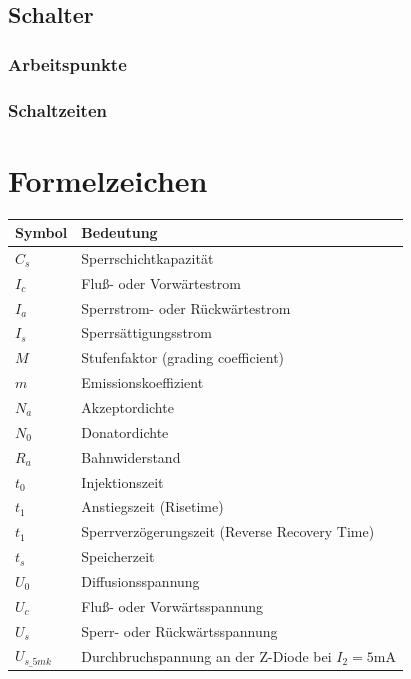 \documentclass[
	a4paper, %
	12pt, %
]{CSUniSchoolLabReport}
\begin{document}
\subsection{Schalter}
\subsubsection{Arbeitspunkte}
\subsubsection{Schaltzeiten}


\section{Formelzeichen}
\begin{table}[H]
\centering
\begin{tabular}{ll}
\toprule
\textbf{Symbol} & \textbf{Bedeutung} \\
\midrule
$C_s$    & Sperrschichtkapazität \\
$I_c$    & Fluß- oder Vorwärtestrom \\
$I_a$    & Sperrstrom- oder Rückwärtestrom \\
$I_s$    & Sperrsättigungsstrom \\
$M$      & Stufenfaktor (grading coefficient) \\
$m$      & Emissionskoeffizient \\
$N_a$    & Akzeptordichte \\
$N_0$    & Donatordichte \\
$R_a$    & Bahnwiderstand \\
$t_0$    & Injektionszeit \\
$t_1$    & Anstiegszeit (Risetime) \\
$t_1$    & Sperrverzögerungszeit (Reverse Recovery Time) \\
$t_s$    & Speicherzeit \\
$U_0$    & Diffusionsspannung \\
$U_c$    & Fluß- oder Vorwärtsspannung \\
$U_s$    & Sperr- oder Rückwärtsspannung \\
$U_{s\_5mk}$ & Durchbruchspannung an der Z-Diode bei $I_2 = 5$mA \\
\bottomrule
\end{tabular}
\end{table}



\end{document}
